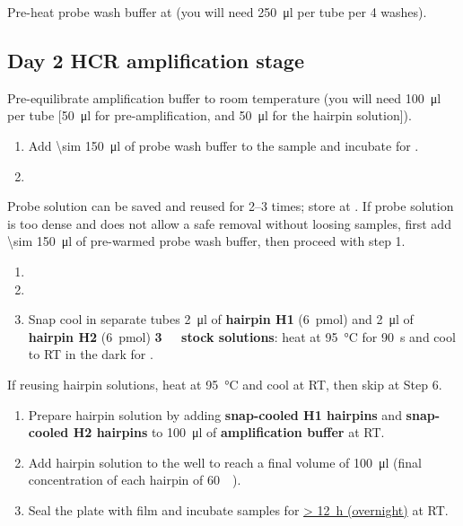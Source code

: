 \documentclass[10pt]{report}
\begin{document}
\bigskip\alert{Pre-heat probe wash buffer at \thirtysevendegree{} (you will need \qty{250}{\ul} per tube per 4 washes).}

\subsection*{Day 2 \textendash{} HCR amplification stage}

\alert{Pre-equilibrate amplification buffer to room temperature (you will need \qty{100}{\ul} per tube [\qty{50}{\ul} for pre-amplification, and \qty{50}{\ul} for the hairpin solution]).}

\begin{enumerate}[series = steps]
	\item Add \qty{\sim 150}{\ul} of probe wash buffer to the sample and incubate for \tenmin.
	\item {}
\end{enumerate}

\bigskip\alert{Probe solution can be saved and reused for 2--3 times; store at \minustwenty.}
\alert{If probe solution is too dense and does not allow a safe removal without loosing samples, first add \qty{\sim 150}{\ul} of pre-warmed probe wash buffer, then proceed with step 1.}

\begin{enumerate}[resume = steps]
	\item {}
	\item {}
	\item Snap cool in separate tubes \qty{2}{\ul} of \textbf{hairpin H1} (\qty{6}{\pmol}) and \qty{2}{\ul} of \textbf{hairpin H2} (\qty{6}{\pmol}) \textbf{\qty{3}{\micro\molar} stock solutions}: heat at \qty{95}{\degreeCelsius} for \qty{90}{\s} and cool to RT in the dark for \halfhour.
\end{enumerate}

\bigskip\alert{If reusing hairpin solutions, heat at \qty{95}{\degreeCelsius} and cool at RT, then skip at Step 6.}

\begin{enumerate}[resume = steps]
	\item Prepare hairpin solution by adding \textbf{snap-cooled H1 hairpins} and \textbf{snap-cooled H2 hairpins} to \qty{100}{\ul} of \textbf{amplification buffer} at RT.
	\item Add hairpin solution to the well to reach a final volume of \qty{100}{\ul} (final concentration of each hairpin of \qty{60}{\nano\molar}).
	\item Seal the plate with film and incubate samples for \underline{\qty{> 12}{\hour} (overnight)} at RT.
\end{enumerate}
\end{document}
